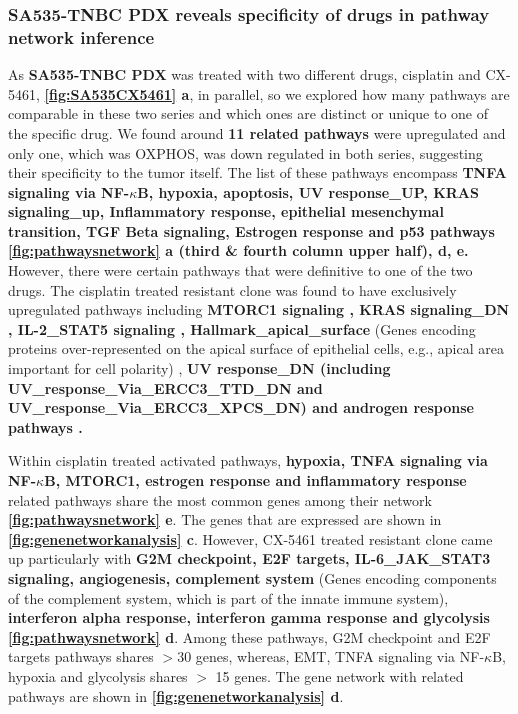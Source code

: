 
\subsubsection{SA535-TNBC PDX reveals specificity of drugs in pathway network inference} 
As \textbf{SA535-TNBC PDX} was treated with two different drugs, cisplatin and CX-5461, \textbf{\autoref{fig:SA535CX5461} a}, in parallel, so we explored how many pathways are comparable in these two series and which ones are distinct or unique to one of the specific drug. 
We found around \textbf{11 related pathways} were upregulated and only one, which was \ac{OXPHOS}, was down regulated in both series, suggesting their specificity to the tumor itself. The list of these pathways encompass \textbf{TNFA signaling via NF-$\kappa$B, hypoxia, apoptosis, UV response\_UP, KRAS signaling\_up, Inflammatory response, epithelial mesenchymal transition, TGF Beta signaling, Estrogen response and p53 pathways \textbf{\autoref{fig:pathwaysnetwork} a (third \& fourth column upper half), d, e}.} However, there were certain pathways that were definitive to one of the two drugs. The cisplatin treated resistant clone was found to have exclusively upregulated pathways including \textbf{MTORC1 signaling \cite{peng2010role}, KRAS signaling\_DN \cite{tao2014oncogenic}, IL-2\_STAT5 signaling \cite{wu2020activation, gutierrez2020role}, Hallmark\_apical\_surface} (Genes encoding proteins over-represented on the apical surface of epithelial cells, e.g., apical area important for cell polarity) \cite{halaoui2015rewiring, wodarz2007cell}, \textbf{UV response\_DN (including UV\_response\_Via\_ERCC3\_TTD\_DN
and UV\_response\_Via\_ERCC3\_XPCS\_DN) and androgen response pathways \cite{rampurwala2016role, michmerhuizen2020we}.}

Within cisplatin treated activated pathways, \textbf{hypoxia, TNFA signaling via NF-$\kappa$B, MTORC1, estrogen response and inflammatory response} related pathways share the most common genes among their network \textbf{\autoref{fig:pathwaysnetwork} e}. The genes that are expressed are shown in  \textbf{\autoref{fig:genenetworkanalysis} c}. However, CX-5461 treated resistant clone came up particularly with \textbf{G2M checkpoint, E2F targets, IL-6\_JAK\_STAT3 signaling, angiogenesis, complement system} (Genes encoding components of the complement system, which is part of the innate immune system), \textbf{ interferon alpha response, interferon gamma response and glycolysis} \textbf{\autoref{fig:pathwaysnetwork} d}. Among these pathways, G2M checkpoint and E2F targets pathways shares $>$30 genes, whereas, \ac{EMT}, TNFA signaling via NF-$\kappa$B, hypoxia and glycolysis shares $>$ 15 genes. The gene network with related pathways are shown in  \textbf{\autoref{fig:genenetworkanalysis} d}. 

